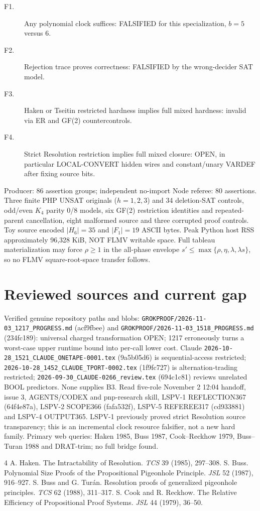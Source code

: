 \documentclass{article}
\begin{document}
\begin{description}
\item[F1.] Any polynomial clock suffices: FALSIFIED for this specialization, $b=5$ versus 6.
\item[F2.] Rejection trace proves correctness: FALSIFIED by the wrong-decider SAT model.
\item[F3.] Haken or Tseitin restricted hardness implies full mixed hardness: invalid via ER and GF(2) countercontrols.
\item[F4.] Strict Resolution restriction implies full mixed closure: OPEN, in particular LOCAL-CONVERT hidden wires and constant/unary VARDEF after fixing source bits.
\end{description}
Producer: 86 assertion groups; independent no-import Node referee: 80 assertions. Three finite PHP UNSAT originals ($h=1,2,3$) and 34 deletion-SAT controls, odd/even $K_4$ parity 0/8 models, six GF(2) restriction identities and repeated-parent cancellation, eight malformed source and three corrupted proof controls. Toy source encoded $|H_6|=35$ and $|F_1|=19$ ASCII bytes. Peak Python host RSS approximately 96,328 KiB, NOT FLMV writable space. Full tableau materialization may force $\rho\ge1$ in the all-phase envelope $s'\le\max\{\rho,\eta,\lambda,\lambda s\}$, so no FLMV square-root-space transfer follows.

\section*{Reviewed sources and current gap}
Verified genuine repository paths and blobs: \texttt{GROKPROOF/2026-11-03\_1217\_PROGRESS.md} (acf9fbee) and \texttt{GROKPROOF/2026-11-03\_1518\_PROGRESS.md} (234fc189): universal charged transformation OPEN; 1217 erroneously turns a worst-case upper runtime bound into per-call lower cost. Claude \texttt{2026-10-28\_1521\_CLAUDE\_ONETAPE-0001.tex} (9a5b05d6) is sequential-access restricted; \texttt{2026-10-28\_1452\_CLAUDE\_TPORT-0002.tex} (1f9fc727) is alternation-trading restricted; \texttt{2026-09-30\_CLAUDE-0266\_review.tex} (694c1c81) reviews unrelated BOOL predictors. None supplies B3. Read five-role November 2 12:04 handoff, issue 3, AGENTS/CODEX and pnp-research skill, LSPV-1 REFLECTION367 (64f4e87a), LSPV-2 SCOPE366 (fafa532f), LSPV-5 REFEREE317 (cd933881) and LSPV-4 OUTPUT365. LSPV-1 previously proved strict Resolution source transparency; this is an incremental clock resource falsifier, not a new hard family. Primary web queries: Haken 1985, Buss 1987, Cook--Reckhow 1979, Buss--Turan 1988 and DRAT-trim; no full bridge found.
\begin{thebibliography}{4}
 A. Haken. The Intractability of Resolution. \emph{TCS} 39 (1985), 297--308.
 S. Buss. Polynomial Size Proofs of the Propositional Pigeonhole Principle. \emph{JSL} 52 (1987), 916--927.
 S. Buss and G. Tur\'an. Resolution proofs of generalized pigeonhole principles. \emph{TCS} 62 (1988), 311--317.
 S. Cook and R. Reckhow. The Relative Efficiency of Propositional Proof Systems. \emph{JSL} 44 (1979), 36--50.
\end{thebibliography}
\end{document}
